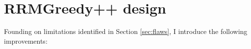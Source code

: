 \section{RRMGreedy++ design}
\label{chap:research:sec:rrmv2}

Founding on limitations identified in Section \ref{sec:flaws}, I introduce the following improvements:

